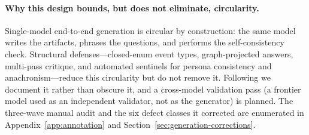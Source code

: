 \paragraph{Why this design bounds, but does not eliminate, circularity.}
Single-model end-to-end generation is circular by construction: the same model
writes the artifacts, phrases the questions, and performs the self-consistency
check. Structural defenses---closed-enum event types, graph-projected answers,
multi-pass critique, and automated sentinels for persona consistency and
anachronism---reduce this circularity but do not remove it. Following
\citet{gebru2021datasheets} we document it rather than obscure it, and a
cross-model validation pass (a frontier model used as an independent validator,
not as the generator) is planned. The three-wave manual audit and the six defect
classes it corrected are enumerated in Appendix~\ref{app:annotation} and
Section~\ref{sec:generation-corrections}.
